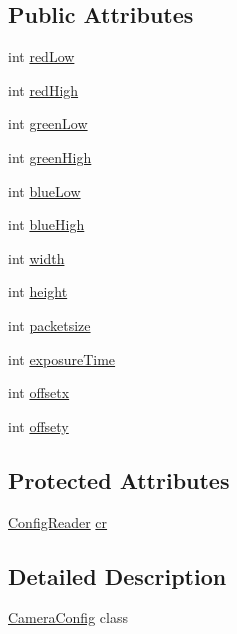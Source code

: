 \subsection*{Public Attributes}
\begin{DoxyCompactItemize}
\item 
int \hyperlink{class_camera_config_af17574ff4f72c58e893b999969be99a5}{red\+Low}
\item 
int \hyperlink{class_camera_config_a03252fbb3abecdf7d64464ec6755120b}{red\+High}
\item 
int \hyperlink{class_camera_config_ab811b83123d53257c1540414959e636e}{green\+Low}
\item 
int \hyperlink{class_camera_config_a65cee18623283080979a00c5cfdec82b}{green\+High}
\item 
int \hyperlink{class_camera_config_ab30d1064804f459fbf913367717b406e}{blue\+Low}
\item 
int \hyperlink{class_camera_config_a1d3dd499f01ce0b4be38f10c2c314ecb}{blue\+High}
\item 
int \hyperlink{class_camera_config_a96696c7f5168a06e31f46bef172d60d1}{width}
\item 
int \hyperlink{class_camera_config_a7d642c69abc40b9ca10c36c73659d08a}{height}
\item 
int \hyperlink{class_camera_config_ae3d156cca77d2082314995cd4b290f83}{packetsize}
\item 
int \hyperlink{class_camera_config_a7bde14cd01c4df4d08eba913bdc610d8}{exposure\+Time}
\item 
int \hyperlink{class_camera_config_a3a61d11401b9b2d6854f9610cdccb51f}{offsetx}
\item 
int \hyperlink{class_camera_config_a6f92a428316eec08a24a25bfdd555d37}{offsety}
\end{DoxyCompactItemize}
\subsection*{Protected Attributes}
\begin{DoxyCompactItemize}
\item 
\hyperlink{class_config_reader}{Config\+Reader} \hyperlink{class_camera_config_a9171ca2ca355b8983ec188582a2f7f8a}{cr}
\end{DoxyCompactItemize}


\subsection{Detailed Description}
\hyperlink{class_camera_config}{Camera\+Config} class 

